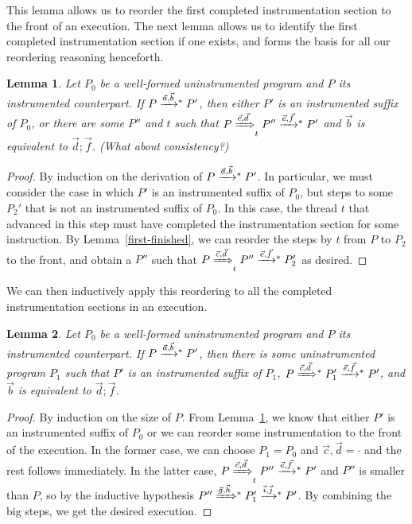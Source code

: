 \documentclass[preprint, 10pt]{sigplanconf}
\newcommand{\tto}[1]{\mathrel{
  \vphantom{\xrightarrow{#1}}
  \smash{\xrightarrow{#1}}
  \vphantom{\to}^{*}}
}
\newcommand{\tTo}[1]{\mathrel{
  \vphantom{\xrightarrow{#1}}
  \smash{\xRightarrow{#1}}
  \vphantom{\to}^{*}}
}
\newtheorem{lemma}{Lemma}
\begin{document}
This lemma allows us to reorder the first completed instrumentation section to the front of an execution. The next lemma allows us to identify the first completed instrumentation section if one exists, and forms the basis for all our reordering reasoning henceforth.
\begin{lemma}\label{next-iexec}Let $P_0$ be a well-formed uninstrumented program and $P$ its instrumented counterpart. If $P \tto{\vec{a}, \vec{b}} P'$, then either $P'$ is an instrumented suffix of $P_0$, or there are some $P''$ and $t$ such that $P \xRightarrow{\vec{c}, \vec{d}}_t P'' \tto{\vec{e}, \vec{f}} P'$ and $\vec{b}$ is equivalent to $\vec{d}; \vec{f}$. (What about consistency?)\end{lemma}
\begin{proof}By induction on the derivation of $P \tto{\vec{a}, \vec{b}} P'$. In particular, we must consider the case in which $P'$ is an instrumented suffix of $P_0$, but steps to some $P_2'$ that is not an instrumented suffix of $P_0$. In this case, the thread $t$ that advanced in this step must have completed the instrumentation section for some instruction. By Lemma~\ref{first-finished}, we can reorder the steps by $t$ from $P$ to $P_2$ to the front, and obtain a $P''$ such that $P \xRightarrow{\vec{c}, \vec{d}}_t P'' \tto{\vec{e}, \vec{f}} P_2'$ as desired.\end{proof}

We can then inductively apply this reordering to all the completed instrumentation sections in an execution.
\begin{lemma}\label{exec-iexec1}Let $P_0$ be a well-formed uninstrumented program and $P$ its instrumented counterpart. If $P \tto{\vec{a}, \vec{b}} P'$, then there is some uninstrumented program $P_1$ such that $P'$ is an instrumented suffix of $P_1$, $P \tTo{\vec{c}, \vec{d}} P_1' \tto{\vec{e}, \vec{f}} P'$, and $\vec{b}$ is equivalent to $\vec{d}; \vec{f}$.\end{lemma}
\begin{proof}By induction on the size of $P$. From Lemma~\ref{next-iexec}, we know that either $P'$ is an instrumented suffix of $P_0$ or we can reorder some instrumentation to the front of the execution. In the former case, we can choose $P_1 = P_0$ and $\vec{c}, \vec{d} = \cdot$ and the rest follows immediately. In the latter case, $P \xRightarrow{\vec{c}, \vec{d}}_t P'' \tto{\vec{e}, \vec{f}} P'$ and $P''$ is smaller than $P$, so by the inductive hypothesis $P'' \tTo{\vec{g}, \vec{h}} P_1' \tto{\vec{i}, \vec{j}} P'$. By combining the big steps, we get the desired execution.\end{proof}
\end{document}
